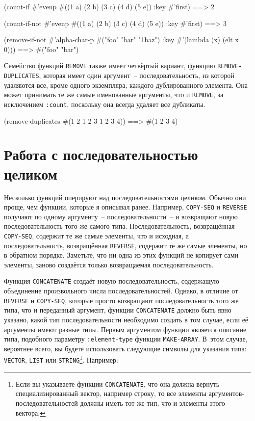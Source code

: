 \begin{myverb}
(count-if #'evenp #((1 a) (2 b) (3 c) (4 d) (5 e)) :key #'first)     ==> 2

(count-if-not #'evenp #((1 a) (2 b) (3 c) (4 d) (5 e)) :key #'first) ==> 3

(remove-if-not #'alpha-char-p
  #("foo" "bar" "1baz") :key #'(lambda (x) (elt x 0))) ==> #("foo" "bar")
\end{myverb}

Семейство функций \lstinline{REMOVE} также имеет четвёртый вариант, функцию
\lstinline{REMOVE-DUPLICATES}, которая имеет один аргумент~-- последовательность, из которой
удаляются все, кроме одного экземпляра, каждого дублированного элемента.  Она может
принимать те же самые именованные аргументы, что и \lstinline{REMOVE}, за исключением
\lstinline{:count}, поскольку она всегда удаляет все дубликаты.

\begin{myverb}
(remove-duplicates #(1 2 1 2 3 1 2 3 4)) ==> #(1 2 3 4)
\end{myverb}

\section{Работа с последовательностью целиком}

Несколько функций оперируют над последовательностями целиком.  Обычно
они проще, чем функции, которые я описывал ранее.  Например,
\lstinline{COPY-SEQ} и \lstinline{REVERSE} получают по одному аргументу~-- последовательности~-- и
возвращают новую последовательность того же самого типа.  Последовательность, возвращённая
\lstinline{COPY-SEQ}, содержит те же самые элементы, что и исходная,
а последовательность, возвращённая \lstinline{REVERSE}, содержит те же
самые элементы, но в обратном порядке.  Заметьте, что ни одна из этих функций не копирует
сами элементы, заново создаётся только возвращаемая последовательность.

Функция \lstinline{CONCATENATE} создаёт новую последовательность, содержащую объединение произвольного
числа последовательностей.  Однако, в отличие от \lstinline{REVERSE} и \lstinline{COPY-SEQ}, которые
просто возвращают последовательность того же типа, что и переданный аргумент, функции
\lstinline{CONCATENATE} должно быть явно указано, какой тип последовательности необходимо
создать в том случае, если её аргументы имеют разные типы.  Первым аргументом функции
является описание типа, подобного параметру \lstinline{:element-type} функции \lstinline{MAKE-ARRAY}.
В~этом случае, вероятнее всего, вы будете использовать следующие символы для указания типа:
\lstinline{VECTOR}, \lstinline{LIST} или \lstinline{STRING}\footnote{Если вы указываете функции
  \lstinline{CONCATENATE}, что она должна вернуть специализированный вектор, например строку,
  то все элементы аргументов-последовательностей должны иметь тот же тип, что и элементы
  этого вектора.}.  Например:

